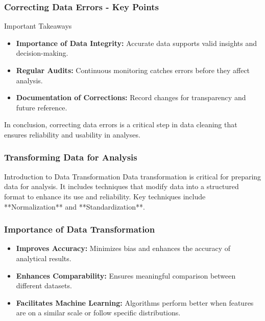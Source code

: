 \documentclass[aspectratio=169]{beamer}
\begin{document}
\begin{frame}[fragile]
    \frametitle{Correcting Data Errors - Key Points}
    \begin{block}{Important Takeaways}
        \begin{itemize}
            \item \textbf{Importance of Data Integrity:} Accurate data supports valid insights and decision-making.
            \item \textbf{Regular Audits:} Continuous monitoring catches errors before they affect analysis.
            \item \textbf{Documentation of Corrections:} Record changes for transparency and future reference.
        \end{itemize}
        In conclusion, correcting data errors is a critical step in data cleaning that ensures reliability and usability in analyses.
    \end{block}
\end{frame}

\begin{frame}[fragile]
    \frametitle{Transforming Data for Analysis}
    \begin{block}{Introduction to Data Transformation}
        Data transformation is critical for preparing data for analysis. It includes techniques that modify data into a structured format to enhance its use and reliability. Key techniques include **Normalization** and **Standardization**.
    \end{block}
\end{frame}

\begin{frame}[fragile]
    \frametitle{Importance of Data Transformation}
    \begin{itemize}
        \item \textbf{Improves Accuracy:} Minimizes bias and enhances the accuracy of analytical results.
        \item \textbf{Enhances Comparability:} Ensures meaningful comparison between different datasets.
        \item \textbf{Facilitates Machine Learning:} Algorithms perform better when features are on a similar scale or follow specific distributions.
    \end{itemize}
\end{frame}
\end{document}
